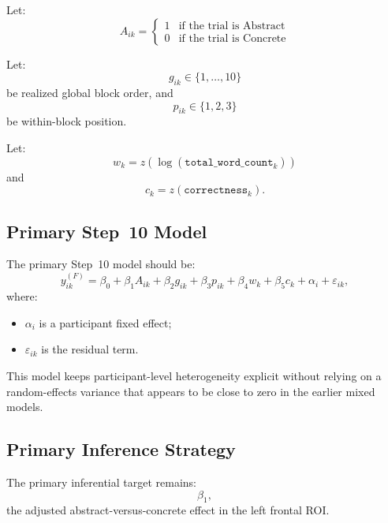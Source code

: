 Let:
\begin{equation}
A_{ik} =
\begin{cases}
1 & \text{if the trial is Abstract} \\
0 & \text{if the trial is Concrete}
\end{cases}
\end{equation}

Let:
\begin{equation}
g_{ik} \in \{1,\dots,10\}
\end{equation}
be realized global block order, and
\begin{equation}
p_{ik} \in \{1,2,3\}
\end{equation}
be within-block position.

Let:
\begin{equation}
w_k = z\!\left(\log(\texttt{total\_word\_count}_k)\right)
\end{equation}
and
\begin{equation}
c_k = z(\texttt{correctness}_k).
\end{equation}

\subsection{Primary Step~10 Model}
The primary Step~10 model should be:
\begin{equation}
y^{(F)}_{ik}
=
\beta_0
+
\beta_1 A_{ik}
+
\beta_2 g_{ik}
+
\beta_3 p_{ik}
+
\beta_4 w_k
+
\beta_5 c_k
+
\alpha_i
+
\varepsilon_{ik},
\end{equation}
where:
\begin{itemize}
    \item \(\alpha_i\) is a participant fixed effect;
    \item \(\varepsilon_{ik}\) is the residual term.
\end{itemize}

This model keeps participant-level heterogeneity explicit without relying on a random-effects variance
that appears to be close to zero in the earlier mixed models.

\subsection{Primary Inference Strategy}
The primary inferential target remains:
\begin{equation}
\beta_1,
\end{equation}
the adjusted abstract-versus-concrete effect in the left frontal ROI.

